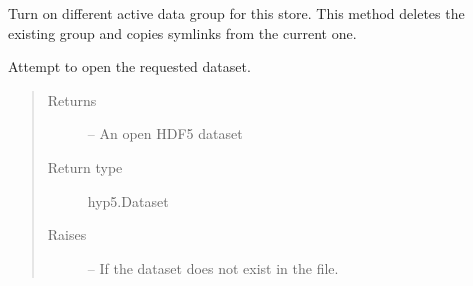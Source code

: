 \documentclass[letterpaper,10pt,english]{sphinxmanual}
\begin{document}
\begin{fulllineitems}
\begin{fulllineitems}
\end{fulllineitems}


\begin{fulllineitems}
\label{\detokenize{xanespy:xanespy.txmstore.TXMStore.energies}}
\end{fulllineitems}


\begin{fulllineitems}
\label{\detokenize{xanespy:xanespy.txmstore.TXMStore.filenames}}
\end{fulllineitems}


\begin{fulllineitems}
\label{\detokenize{xanespy:xanespy.txmstore.TXMStore.fit_parameters}}
\end{fulllineitems}


\begin{fulllineitems}
\label{\detokenize{xanespy:xanespy.txmstore.TXMStore.fork_data_group}}
Turn on different active data group for this store. This method
deletes the existing group and copies symlinks from the
current one.

\end{fulllineitems}


\begin{fulllineitems}
\label{\detokenize{xanespy:xanespy.txmstore.TXMStore.get_dataset}}
Attempt to open the requested dataset.
\begin{quote}\begin{description}
\item[{Returns}] \leavevmode
{} -- An open HDF5 dataset

\item[{Return type}] \leavevmode
hyp5.Dataset

\item[{Raises}] \leavevmode
{} -- If the dataset does not exist in the file.


\end{description}
\end{quote}
\end{fulllineitems}
\end{fulllineitems}
\end{document}

